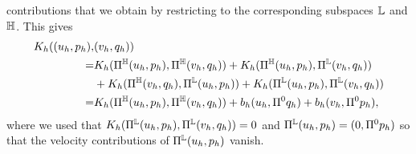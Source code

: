 \documentclass[pdflatex,sn-mathphys,Numbered]{sn-jnl}%
\theoremstyle{remark}%
\theoremstyle{definition}%
\begin{document}
contributions that we obtain by restricting to the corresponding subspaces $\mathbb{L}$
and $\mathbb{H}$. This gives
\begin{align} \label{eq::K_on_TT}
  \Kh((u_h,p_h),&(v_h,q_h)) \nonumber \\ =
&\Kh(\Pi^\HH(u_h,p_h),\Pi^\HH(v_h,q_h)) + \Kh(\Pi^{\HH}(u_h,p_h),\Pi^\LL(v_h,q_h)) \nonumber \\
&+ \Kh(\Pi^{\HH}(v_h,q_h),\Pi^\LL(u_h,p_h)) + \Kh(\Pi^{\LL}(u_h,p_h),\Pi^\LL(v_h,q_h)) \nonumber \\ %
  =& \Kh(\Pi^\HH(u_h,p_h),\Pi^\HH(v_h,q_h)) + b_h(u_h,\Pi^0 q_h) + b_h(v_h,\Pi^0p_h),
\end{align}
where we used that $K_h(\Pi^{\mathbb{L}}(u_h,p_h),\Pi^{\mathbb{L}}(v_h,q_h)) = 0$ and $\Pi^{\mathbb{L}}(u_h,p_h) = (0,\Pi^0 p_h)$ so that the velocity contributions of $\Pi^{\mathbb{L}}(u_h,p_h)$ vanish.
\end{document}
